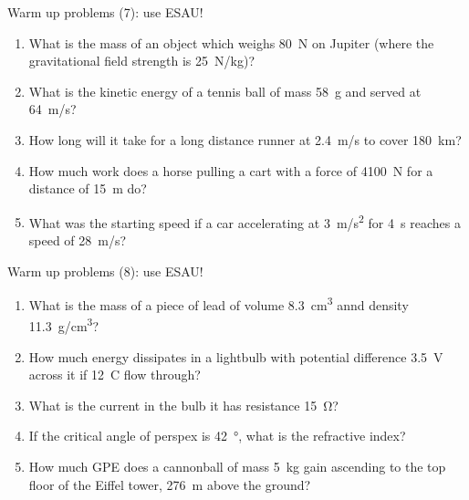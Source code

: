 \documentclass[14pt]{beamer}
\begin{document}
\begin{frame}{Warm up problems (7): use ESAU!}
\vspace*{-0.8em}\begin{enumerate}
\item\label{8.2} What is the mass of an object which weighs \SI{80}{N} on Jupiter (where the gravitational field strength is \SI{25}{N/kg})?
\item\label{6.1} What is the kinetic energy of a tennis ball of mass \SI{58}{g} and served at \SI{64}{m/s}?
\item\label{1.3} How long will it take for a long distance runner at \SI{2.4}{m/s} to cover \SI{180}{km}?
\item\label{5.1} How much work does a horse pulling a cart with a force of \SI{4100}{N} for a distance of \SI{15}{m} do?
\item\label{3.3} What was the starting speed if a car accelerating at \SI{3}{m/s^2} for \SI{4}{s} reaches a speed of \SI{28}{m/s}?
\end{enumerate}
\end{frame}

\begin{frame}{Warm up problems (8): use ESAU!}
\vspace*{-0.8em}\begin{enumerate}
\item\label{4.2} What is the mass of a piece of lead of volume \SI{8.3}{cm^3} annd density \SI{11.3}{g/cm^3}?
\item\label{13.1} How much energy dissipates in a lightbulb with potential difference \SI{3.5}{V} across it if \SI{12}{C} flow through?
\item\label{11.2} What is the current in the bulb it has resistance \SI{15}{\ohm}?
\item\label{16.3} If the critical angle of perspex is \SI{42}{\degree}, what is the refractive index?
\item\label{7.1} How much GPE does a cannonball of mass \SI{5}{kg} gain ascending to the top floor of the Eiffel tower, \SI{276}{m} above the ground?
\end{enumerate}
\end{frame}
\end{document}
